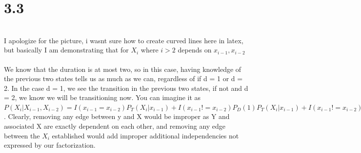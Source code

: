 \documentclass[12pt]{article}
\begin{document}
\section{3.3}

\\
I apologize for the picture, i wasnt sure how to create curved lines here in latex, but basically I am demonstrating that for $X_i$ where $i > 2$ depends on $x_{i-1},x_{i-2}$
\\\\
We know that the duration is at most two, so in this case, having knowledge of the previous two states tells us as much as we can, regardless of if d = 1 or d = 2. In the case d = 1, we see the transition in the previous two states, if not and d = 2, we know we will be transitioning now. You can imagine it as $P(X_i|X_{i-1},X_{i-2}) = I(x_{i-1} = x_{i-2}) P_T(X_i|x_{i-1}) + I(x_{i-1} != x_{i-2})P_D(1)P_T(X_i|x_{i-1}) + I(x_{i-1} != x_{i-2})P_D(2)$. Clearly, removing any edge between y and X would be improper as Y and associated X are exactly dependent on each other, and removing any edge between the $X_i$ established would add improper additional independencies not expressed by our factorization.
\end{document}
